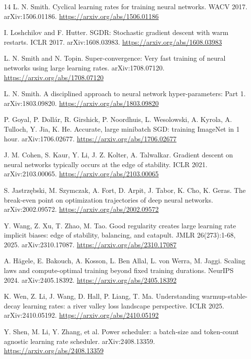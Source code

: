 \documentclass[11pt,a4paper]{article}
\begin{document}
\begin{thebibliography}{14}
 L. N. Smith. Cyclical learning rates for training neural networks. WACV 2017. arXiv:1506.01186. \url{https://arxiv.org/abs/1506.01186}

 I. Loshchilov and F. Hutter. SGDR: Stochastic gradient descent with warm restarts. ICLR 2017. arXiv:1608.03983. \url{https://arxiv.org/abs/1608.03983}

 L. N. Smith and N. Topin. Super-convergence: Very fast training of neural networks using large learning rates. arXiv:1708.07120. \url{https://arxiv.org/abs/1708.07120}

 L. N. Smith. A disciplined approach to neural network hyper-parameters: Part 1. arXiv:1803.09820. \url{https://arxiv.org/abs/1803.09820}

 P. Goyal, P. Dollár, R. Girshick, P. Noordhuis, L. Wesolowski, A. Kyrola, A. Tulloch, Y. Jia, K. He. Accurate, large minibatch SGD: training ImageNet in 1 hour. arXiv:1706.02677. \url{https://arxiv.org/abs/1706.02677}

 J. M. Cohen, S. Kaur, Y. Li, J. Z. Kolter, A. Talwalkar. Gradient descent on neural networks typically occurs at the edge of stability. ICLR 2021. arXiv:2103.00065. \url{https://arxiv.org/abs/2103.00065}

 S. Jastrz\k{e}bski, M. Szymczak, A. Fort, D. Arpit, J. Tabor, K. Cho, K. Geras. The break-even point on optimization trajectories of deep neural networks. arXiv:2002.09572. \url{https://arxiv.org/abs/2002.09572}

 Y. Wang, Z. Xu, T. Zhao, M. Tao. Good regularity creates large learning rate implicit biases: edge of stability, balancing, and catapult. JMLR 26(273):1-68, 2025. arXiv:2310.17087. \url{https://arxiv.org/abs/2310.17087}

 A. H\"agele, E. Bakouch, A. Kosson, L. Ben Allal, L. von Werra, M. Jaggi. Scaling laws and compute-optimal training beyond fixed training durations. NeurIPS 2024. arXiv:2405.18392. \url{https://arxiv.org/abs/2405.18392}

 K. Wen, Z. Li, J. Wang, D. Hall, P. Liang, T. Ma. Understanding warmup-stable-decay learning rates: a river valley loss landscape perspective. ICLR 2025. arXiv:2410.05192. \url{https://arxiv.org/abs/2410.05192}

 Y. Shen, M. Li, Y. Zhang, et al. Power scheduler: a batch-size and token-count agnostic learning rate scheduler. arXiv:2408.13359. \url{https://arxiv.org/abs/2408.13359}


\end{thebibliography}
\end{document}
